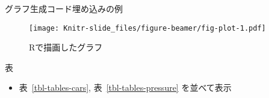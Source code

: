 \documentclass[
  ignorenonframetext,
]{beamer}
\providecommand{\tightlist}{%
  \setlength{\itemsep}{0pt}\setlength{\parskip}{0pt}}
\begin{document}
\begin{frame}{グラフ生成コード埋め込みの例}
\protect\hypertarget{ux30b0ux30e9ux30d5ux751fux6210ux30b3ux30fcux30c9ux57cbux3081ux8fbcux307fux306eux4f8b}{}
\begin{figure}

{\centering \texttt{[image: Knitr-slide\_files/figure-beamer/fig-plot-1.pdf]}

}

\caption{\label{fig-plot}Rで描画したグラフ}

\end{figure}
\end{frame}

\begin{frame}{表}
\protect\hypertarget{ux8868}{}
\begin{itemize}
\tightlist
\item
  表~\ref{tbl-tables-cars}, 表~\ref{tbl-tables-pressure} を並べて表示
\end{itemize}

\begin{table}

%

\caption{\label{tbl-tables}複数の表}

\end{table}
\end{frame}
\end{document}
